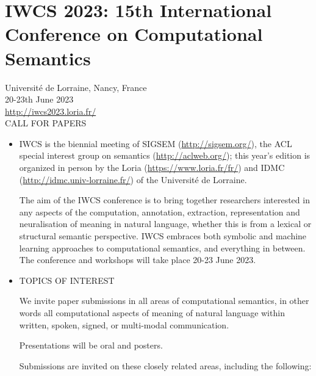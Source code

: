 \documentclass[prodmode,acmtecs]{acmsmall} %
\begin{document}
\section{IWCS 2023: 15th International Conference on Computational Semantics}\label{IWCS2023}  Université de Lorraine, Nancy, France\\ 
  20-23th June 2023   \\ 
  \href{http://iwcs2023.loria.fr/}{http://iwcs2023.loria.fr/}\\ 
CALL FOR PAPERS 

\begin{itemize}\item   IWCS is the biennial meeting of SIGSEM (\href{http://sigsem.org/}{http://sigsem.org/}), the ACL special interest group on semantics (\href{http://aclweb.org/}{http://aclweb.org/}); this year's edition is organized in person by the Loria (\href{https://www.loria.fr/fr/}{https://www.loria.fr/fr/}) and IDMC (\href{http://idmc.univ-lorraine.fr/}{http://idmc.univ-lorraine.fr/}) of the Université de Lorraine. 
 
  The aim of the IWCS conference is to bring together researchers interested in any aspects of the computation, annotation, extraction, representation and neuralisation of meaning in natural language, whether this is from a lexical or structural semantic perspective. IWCS embraces both symbolic and machine learning approaches to computational semantics, and everything in between. The conference and workshops will take place 20-23 June 2023. 
 
\item  TOPICS OF INTEREST 
 
  We invite paper submissions in all areas of computational semantics, in other words all computational aspects of meaning of natural language within written, spoken, signed, or multi-modal communication. 
 
  Presentations will be oral and posters. 
 
  Submissions are invited on these closely related areas, including the following: 
 

\end{itemize}
\end{document}
